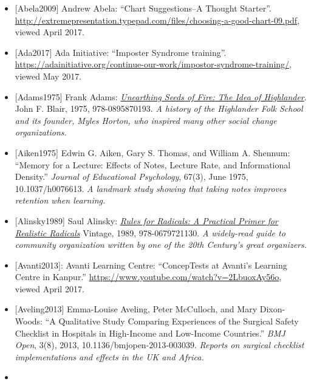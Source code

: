 \documentclass[10pt,statementpaper]{memoir}
\begin{document}
\begin{itemize}
\item
  \protect\hypertarget{abela-chart}{}{{[}Abela2009{]}} Andrew Abela:
  ``Chart Suggestions--A Thought Starter''.
  \url{http://extremepresentation.typepad.com/files/choosing-a-good-chart-09.pdf},
  viewed April 2017.
\item
  \protect\hypertarget{ada-imposter}{}{{[}Ada2017{]}} Ada Initiative:
  ``Imposter Syndrome training''.
  \url{https://adainitiative.org/continue-our-work/impostor-syndrome-training/},
  viewed May 2017.
\item
  \protect\hypertarget{adams-seeds}{}{{[}Adams1975{]}} {Frank Adams:
  \emph{\href{https://www.amazon.com/Unearthing-Seeds-Fire-Idea-Highlander/dp/0895870193/}{Unearthing
  Seeds of Fire: The Idea of Highlander}}. John F. Blair, 1975,
  978-0895870193. \emph{A history of the Highlander Folk School and its
  founder, Myles Horton, who inspired many other social change
  organizations.}}
\item
  \protect\hypertarget{aiken-note-taking}{}{{[}Aiken1975{]}} Edwin G.
  Aiken, Gary S. Thomas, and William A. Shennum: ``Memory for a Lecture:
  Effects of Notes, Lecture Rate, and Informational Density.''
  \emph{Journal of Educational Psychology}, 67(3), June 1975,
  10.1037/h0076613. \emph{A landmark study showing that taking notes
  improves retention when learning.}
\item
  \protect\hypertarget{alinsky-rules}{}{{[}Alinsky1989{]}} {Saul
  Alinsky:
  \emph{\href{https://www.amazon.com/Rules-Radicals-Practical-Primer-Realistic/dp/0679721134/}{Rules
  for Radicals: A Practical Primer for Realistic Radicals}} Vintage,
  1989, 978-0679721130. \emph{A widely-read guide to community
  organization written by one of the 20th Century's great organizers.}}
\item
  \protect\hypertarget{video-peer-instruction}{}{{[}Avanti2013{]}}:
  Avanti Learning Centre: ``ConcepTests at Avanti's Learning Centre in
  Kanpur.'' \url{https://www.youtube.com/watch?v=2LbuoxAy56o}, viewed
  April 2017.
\item
  \protect\hypertarget{aveling-checklists}{}{{[}Aveling2013{]}}
  Emma-Louise Aveling, Peter McCulloch, and Mary Dixon-Woods: ``A
  Qualitative Study Comparing Experiences of the Surgical Safety
  Checklist in Hospitals in High-Income and Low-Income Countries.''
  \emph{BMJ Open}, 3(8), 2013, 10.1136/bmjopen-2013-003039.
  \emph{Reports on surgical checklist implementations and effects in the
  UK and Africa.}
\item

\end{itemize}
\end{document}
